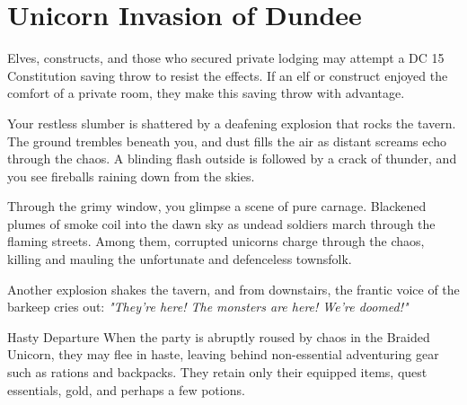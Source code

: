 \chapter*{Unicorn Invasion of Dundee}\label{chapter:UnicornInvasionOfDundee}

{\entryfont Elves, constructs, and those who secured private lodging may attempt a DC 15 Constitution saving throw to resist the effects. If an elf or construct enjoyed the comfort of a private room, they make this saving throw with advantage.}

\begin{DndReadAloud}
	Your restless slumber is shattered by a deafening explosion that rocks the tavern. The ground trembles beneath you, and dust fills the air as distant screams echo through the chaos. A blinding flash outside is followed by a crack of thunder, and you see fireballs raining down from the skies.

	Through the grimy window, you glimpse a scene of pure carnage. Blackened plumes of smoke coil into the dawn sky as undead soldiers march through the flaming streets. Among them, corrupted unicorns charge through the chaos, killing and mauling the unfortunate and defenceless townsfolk.

	Another explosion shakes the tavern, and from downstairs, the frantic voice of the barkeep cries out: \textit{"They're here! The monsters are here! We're doomed!"}
\end{DndReadAloud}

\begin{DndOptionalRule}{Hasty Departure}\label{or:HastyDeparture}%
	When the party is abruptly roused by chaos in the Braided Unicorn, they may flee in haste, leaving behind non-essential adventuring gear such as rations and backpacks. They retain only their equipped items, quest essentials, gold, and perhaps a few potions.
\end{DndOptionalRule}

